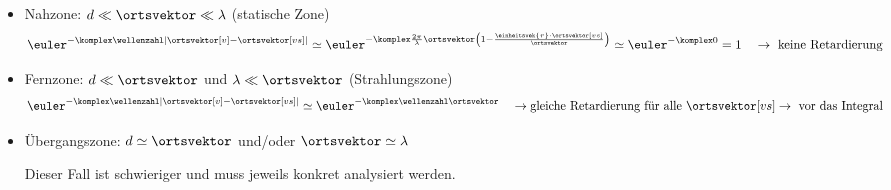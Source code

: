 \begin{frame}
\begin{columns}
\begin{column}{.6\textwidth}
\begin{itemize}[<+->]
  \end{itemize}
  \end{column}
  \end{columns}
  \begin{itemize}[<+->]
  \item \alert{Nahzone}: \(d \ll \ortsvektor \ll \lambda\) (statische Zone)
    \begin{equation*}
      \euler^{-\komplex \wellenzahl |\ortsvektor[v]-\ortsvektor[vs]|} \simeq \euler^{-\komplex \frac{2\pi}{\lambda}\ortsvektor \left(1 - \frac{\einheitsvek{r}\cdot \ortsvektor[vs]}{\ortsvektor} \right) } \simeq \euler^{-\komplex 0} =1 \quad \to \text{ keine Retardierung}
    \end{equation*}
  \item \alert{Fernzone}: \(d \ll \ortsvektor\) und \(\lambda \ll \ortsvektor\) (Strahlungszone)
    \begin{equation*}
      \euler^{-\komplex \wellenzahl |\ortsvektor[v]-\ortsvektor[vs]|} \simeq \euler^{-\komplex \wellenzahl \ortsvektor} \quad\to \text{gleiche Retardierung für alle }\ortsvektor[vs] \to \text{ vor das Integral}
    \end{equation*}
  \item \alert{Übergangszone}: \(d \simeq \ortsvektor\) und/oder \(\ortsvektor\simeq\lambda\)

    Dieser Fall ist schwieriger und muss jeweils konkret analysiert werden.
  \end{itemize}
\end{frame}



   
